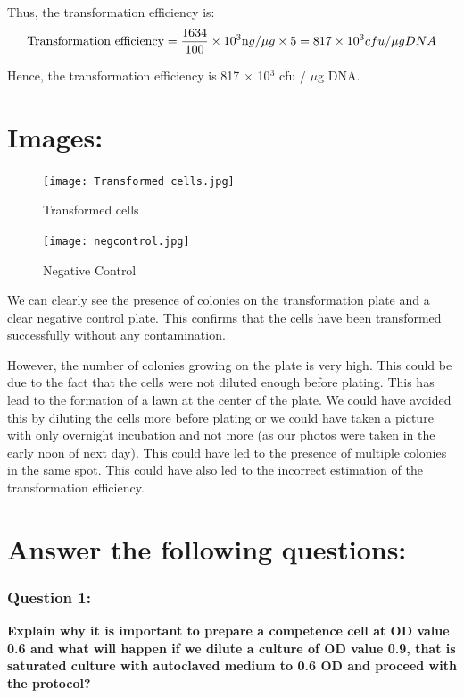 \documentclass{report}
\begin{document}
Thus, the transformation efficiency is:
\begin{equation}
  \text{Transformation efficiency} = \frac{1634}{100} \times {10^3}{\text ng/\mu g} \times {5} = 817 \times {10^3} cfu / \mu g   DNA
\end{equation}

Hence, the transformation efficiency is 817 $\times$ 10$^3$ cfu / $\mu$g DNA.




\section*{Images:}



\begin{figure}[!ht]
  \centering 
  \texttt{[image: Transformed cells.jpg]} 
  \caption{Transformed cells} 
  \label{fig: transformed cells }  
\end{figure}

\begin{figure}[!ht]
  \centering 
  \texttt{[image: negcontrol.jpg]} 
  \caption{Negative Control} 
  \label{fig: negative control }  
\end{figure}

\vspace{10cm}

We can clearly see the presence of colonies on the transformation plate and a clear negative control plate. This confirms that the cells have been transformed successfully
without any contamination.

However, the number of colonies growing on the plate is very high. This could be due to the fact that the cells were not diluted enough before plating.
This has lead to the formation of a lawn at the center of the plate. We could have avoided this by diluting the cells more before plating or we could have taken a picture with only overnight incubation and not more (as our photos were taken in the early noon of next day).
This could have led to the presence of multiple colonies in the same spot. This could have also led to the incorrect estimation of the transformation efficiency.

\section*{Answer the following questions:}

\subsubsection*{Question 1:}
\textbf{Explain why it is important to prepare a competence cell at OD value 0.6 and what
will happen if we dilute a culture of OD value 0.9, that is saturated culture with
autoclaved medium to 0.6 OD and proceed with the protocol?}
\end{document}
